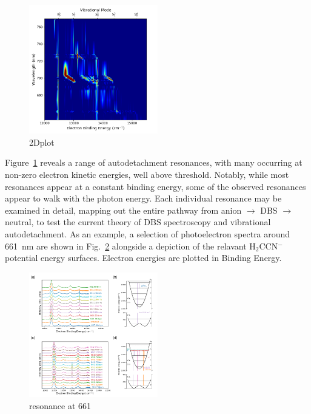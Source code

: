 \documentclass[journal=jpcafh,manuscript=article,layout=onecolumn, 12pt]{achemso}
\begin{document}
\begin{figure}
	\includegraphics[width=0.5\textwidth]{figures/2DJuly21}
	\caption{2Dplot}
	\label{fig:PESall}
\end{figure}

Figure~\ref{fig:PESall} reveals a range of autodetachment resonances, with many occurring at non-zero electron kinetic energies, well above threshold. Notably, while most resonances appear at a constant binding energy, some of the observed resonances appear to walk with the photon energy. Each individual resonance may be examined in detail, mapping out the entire pathway from anion $\rightarrow$ DBS $\rightarrow$ neutral, to test the current theory of DBS spectroscopy and vibrational autodetachment. As an example, a selection of photoelectron spectra around 661~nm are shown in Fig.~\ref{fig:661} alongside a depiction of the relavant H$_2$CCN$^-$ potential energy surfaces. Electron energies are plotted in Binding Energy.

\begin{figure}
	\includegraphics[width=0.5\textwidth]{figures/Fig3}
	\caption{resonance at 661}
	\label{fig:661}
\end{figure}
\end{document}

